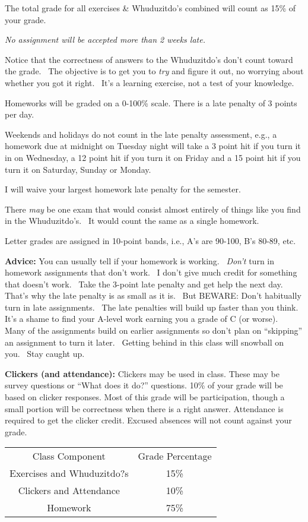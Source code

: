 \documentclass[]{article}
\begin{document}
The total grade for all exercises \& Whuduzitdo's combined will count as
15\% of your grade.

\emph{No assignment will be accepted more than 2 weeks late.}


Notice that the correctness of answers to the Whuduzitdo's don't count
toward the grade.~ The objective is to get you to \emph{try} and figure
it out, no worrying about whether you got it right.~ It's a learning
exercise, not a test of your knowledge.


Homeworks will be graded on a 0-100\% scale. There is a late penalty of
3 points per day.

Weekends and holidays  do not count in the late
penalty assessment, e.g., a homework due at midnight on Tuesday night
will take a 3 point hit if you turn it in on Wednesday, a 12 point hit if
you turn it on Friday and a 15 point hit if you turn it on Saturday,
Sunday or Monday.

I will waive your largest homework late penalty for the semester.


There \emph{may} be one exam that would consist almost entirely of
things like you find in the Whuduzitdo's.~ It would count the same as a
single homework.

Letter grades are assigned in 10-point bands, i.e., A's are
90-100, B's 80-89, etc.


\textbf{Advice:} You can usually tell if your homework is working.~
\emph{Don't} turn in homework assignments that don't work.~ I don't give
much credit for something that doesn't work.~ Take the 3-point late
penalty and get help the next day.~ That's why the late penalty is as
small as it is.~ But BEWARE: Don't habitually turn in late assignments.~
The late penalties will build up faster than you think.~ It's a shame to
find your A-level work earning you a grade of C (or worse).~ Many of the
assignments build on earlier assignments so don't plan on ``skipping''
an assignment to turn it later.~ Getting behind
in this class will snowball on you.~ Stay caught up.

\textbf{Clickers (and attendance):}  Clickers may be used in class.  These may
be survey questions or “What does it do?” questions.  10\% of your grade will
be based on clicker responses.  Most of this grade will be participation,
though a small portion will be correctness when there is a right answer.
Attendance is required to get the clicker credit.  Excused absences will not
count against your grade.

\begin{tabular}[h]{|cc|}
    Class Component & Grade Percentage \\
    Exercises and Whuduzitdo?s & 15\% \\
    Clickers and Attendance & 10\% \\
    Homework & 75\% \\
\end{tabular}
\end{document}
